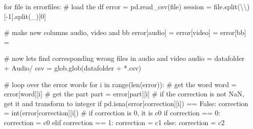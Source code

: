 \documentclass[
  letterpaper,
  DIV=11,
  numbers=noendperiod]{scrreprt}
\newenvironment{Shaded}{\begin{snugshade}}{\end{snugshade}}
\newcommand{\BuiltInTok}[1]{\textcolor[rgb]{0.00,0.23,0.31}{#1}}
\newcommand{\CharTok}[1]{\textcolor[rgb]{0.13,0.47,0.30}{#1}}
\newcommand{\CommentTok}[1]{\textcolor[rgb]{0.37,0.37,0.37}{#1}}
\newcommand{\ControlFlowTok}[1]{\textcolor[rgb]{0.00,0.23,0.31}{#1}}
\newcommand{\DecValTok}[1]{\textcolor[rgb]{0.68,0.00,0.00}{#1}}
\newcommand{\KeywordTok}[1]{\textcolor[rgb]{0.00,0.23,0.31}{#1}}
\newcommand{\NormalTok}[1]{\textcolor[rgb]{0.00,0.23,0.31}{#1}}
\newcommand{\OperatorTok}[1]{\textcolor[rgb]{0.37,0.37,0.37}{#1}}
\newcommand{\StringTok}[1]{\textcolor[rgb]{0.13,0.47,0.30}{#1}}
\newcommand{\VariableTok}[1]{\textcolor[rgb]{0.07,0.07,0.07}{#1}}
\begin{document}
\begin{Shaded}
\begin{Highlighting}[]
\ControlFlowTok{for} \BuiltInTok{file} \KeywordTok{in}\NormalTok{ errorfiles:}
    \CommentTok{\# load the df}
\NormalTok{    error }\OperatorTok{=}\NormalTok{ pd.read\_csv(}\BuiltInTok{file}\NormalTok{)}
\NormalTok{    session }\OperatorTok{=} \BuiltInTok{file}\NormalTok{.split(}\StringTok{\textquotesingle{}}\CharTok{\textbackslash{}\textbackslash{}}\StringTok{\textquotesingle{}}\NormalTok{)[}\OperatorTok{{-}}\DecValTok{1}\NormalTok{].split(}\StringTok{\textquotesingle{}\_\textquotesingle{}}\NormalTok{)[}\DecValTok{0}\NormalTok{]}

    \CommentTok{\# make new columns audio, video and bb}
\NormalTok{    error[}\StringTok{\textquotesingle{}audio\textquotesingle{}}\NormalTok{] }\OperatorTok{=} \StringTok{\textquotesingle{}\textquotesingle{}}
\NormalTok{    error[}\StringTok{\textquotesingle{}video\textquotesingle{}}\NormalTok{] }\OperatorTok{=} \StringTok{\textquotesingle{}\textquotesingle{}}
\NormalTok{    error[}\StringTok{\textquotesingle{}bb\textquotesingle{}}\NormalTok{] }\OperatorTok{=} \StringTok{\textquotesingle{}\textquotesingle{}}

    \CommentTok{\# now let\textquotesingle{}s find corresponding wrong files in audio and video}
\NormalTok{    audio }\OperatorTok{=}\NormalTok{ datafolder }\OperatorTok{+} \StringTok{\textquotesingle{}Audio/\textquotesingle{}}
\NormalTok{    csv }\OperatorTok{=}\NormalTok{ glob.glob(datafolder }\OperatorTok{+} \StringTok{\textquotesingle{}*.csv\textquotesingle{}}\NormalTok{)}

    \CommentTok{\# loop over the error words}
    \ControlFlowTok{for}\NormalTok{ i }\KeywordTok{in} \BuiltInTok{range}\NormalTok{(}\BuiltInTok{len}\NormalTok{(error)):}
        \CommentTok{\# get the word}
\NormalTok{        word }\OperatorTok{=}\NormalTok{ error[}\StringTok{\textquotesingle{}word\textquotesingle{}}\NormalTok{][i]}
        \CommentTok{\# get the part}
\NormalTok{        part }\OperatorTok{=}\NormalTok{ error[}\StringTok{\textquotesingle{}part\textquotesingle{}}\NormalTok{][i]}
        \CommentTok{\# if the correction is not NaN, get it and transform to integer}
        \ControlFlowTok{if}\NormalTok{ pd.isna(error[}\StringTok{\textquotesingle{}correction\textquotesingle{}}\NormalTok{][i]) }\OperatorTok{==} \VariableTok{False}\NormalTok{:}
\NormalTok{            correction }\OperatorTok{=} \BuiltInTok{int}\NormalTok{(error[}\StringTok{\textquotesingle{}correction\textquotesingle{}}\NormalTok{][i])}
            \CommentTok{\# if correction is 0, it is c0}
            \ControlFlowTok{if}\NormalTok{ correction }\OperatorTok{==} \DecValTok{0}\NormalTok{:}
\NormalTok{                correction }\OperatorTok{=} \StringTok{\textquotesingle{}c0\textquotesingle{}}
            \ControlFlowTok{elif}\NormalTok{ correction }\OperatorTok{==} \DecValTok{1}\NormalTok{:}
\NormalTok{                correction }\OperatorTok{=} \StringTok{\textquotesingle{}c1\textquotesingle{}}
            \ControlFlowTok{else}\NormalTok{:}
\NormalTok{                correction }\OperatorTok{=} \StringTok{\textquotesingle{}c2\textquotesingle{}}
            

\end{Highlighting}
\end{Shaded}
\end{document}
